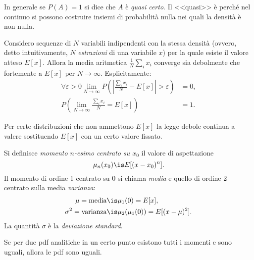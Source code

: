 In generale se $P(A)=1$ si dice che $A$ è \emph{quasi certo}. Il <<quasi>> è perché nel continuo si possono costruire insiemi di probabilità nulla nei quali la densità è non nulla.

\begin{fact}
	\label{th:grossnum}
	Considero sequenze di $N$ variabili indipendenti con la stessa densità (ovvero, detto intuitivamente, $N$ \emph{estrazioni} di una variabile $x$) per la quale esiste il valore atteso $E[x]$.
	Allora la media aritmetica $\frac1N\sum_ix_i$ converge sia debolmente che fortemente a $E[x]$ per $N\to\infty$.
	Esplicitamente:
	\begin{align*}
		\forall\varepsilon > 0 \lim_{N\to \infty} P\left( \left| \frac{\sum_ix_i}N - E[x] \right| > \varepsilon \right) &= 0, \\
		P\left( \lim_{N\to \infty} \frac{\sum_ix_i}N = E[x] \right) &= 1.
	\end{align*}
\end{fact}

\noindent Per certe distribuzioni che non ammettono $E[x]$ la legge debole continua a valere sostituendo $E[x]$ con un certo valore fissato.

\begin{definition}[Momenti]
	Si definisce \emph{momento $n$-esimo centrato su $x_0$} il valore di aspettazione
	\begin{equation*}
		\mu_n(x_0) \is E[(x - x_0)^n].
	\end{equation*}
	Il momento di ordine 1 centrato su 0 si chiama \emph{media} e quello di ordine 2 centrato sulla media \emph{varianza}:
	\begin{align*}
		\mu = \text{media} &\is \mu_1(0) = E[x], \\
		\sigma^2 = \text{varianza} &\is \mu_2(\mu_1(0)) = E[(x-\mu)^2].
	\end{align*}
	La quantità $\sigma$ è la \emph{deviazione standard}.
\end{definition}

\begin{fact}
	\label{th:pdfmom}
	Se per due pdf analitiche in un certo punto esistono tutti i momenti e sono uguali, allora le pdf sono uguali.
\end{fact}
